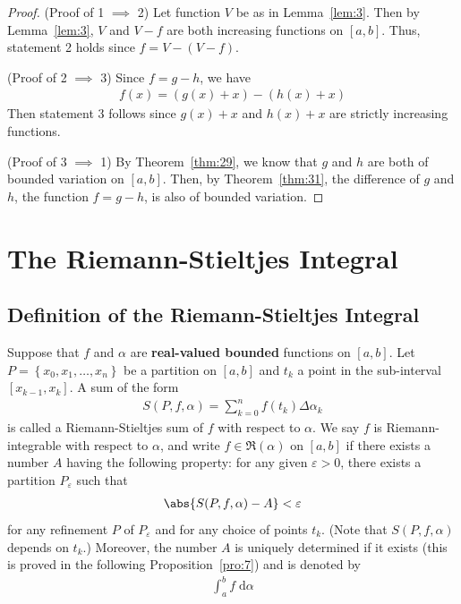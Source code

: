 \documentclass[thmcnt=section, 12pt]{elegantbook}
\begin{document}
\begin{proof}
    (Proof of 1 $\implies$ 2) Let function $V$ be as in Lemma~\ref{lem:3}. Then by Lemma~\ref{lem:3}, $V$ and $V - f$ are both increasing functions on $[a, b]$. Thus, statement 2 holds since $f = V - (V - f)$.

    \par (Proof of 2 $\implies$ 3) Since $f = g - h$, we have 
    \begin{align*}
        f(x) = (g(x) + x) - (h(x) + x)
    \end{align*}
    Then statement 3 follows since $g(x) + x$ and $h(x) + x$ are strictly increasing functions.

    \par (Proof of 3 $\implies$ 1) By Theorem~\ref{thm:29}, we know that $g$ and $h$ are both of bounded variation on $[a, b]$. Then, by Theorem~\ref{thm:31}, the difference of $g$ and $h$, the function $f = g - h$, is also of bounded variation.
\end{proof}


\chapter{The Riemann-Stieltjes Integral} %


\section{Definition of the Riemann-Stieltjes Integral}


\begin{definition} \label{def:7}
    Suppose that $f$ and $\alpha$ are \textbf{real-valued bounded} functions on $[a,b]$. Let $P = \left\{x_0, x_1, \ldots, x_n\right\}$ be a partition on $[a, b]$ and $t_k$ a point in the sub-interval $[x_{k-1}, x_k]$. A sum of the form 
    \begin{align*}
        S(P,f,\alpha)
        = \sum_{k=0}^n f(t_k) \Delta \alpha_k
    \end{align*}
    is called a Riemann-Stieltjes sum of $f$ with respect to $\alpha$. We say $f$ is Riemann-integrable with respect to $\alpha$, and write $f \in \mathfrak{R}(\alpha)$ on $[a,b]$ if there exists a number $A$ having the following property: for any given $\varepsilon > 0$, there exists a partition $P_\varepsilon$ such that 
    \begin{align*}
        \abs{S(P,f,\alpha) - A} < \varepsilon
    \end{align*}
    for any refinement $P$ of $P_\varepsilon$ and for any choice of points $t_k$. (Note that $S(P,f,\alpha)$ depends on $t_k$.) Moreover, the number $A$ is uniquely determined if it exists (this is proved in the following Proposition~\ref{pro:7}) and is denoted by \begin{align*}
        \int_a^b f \; \mathrm{d}\alpha
    \end{align*}
\end{definition}
\end{document}
